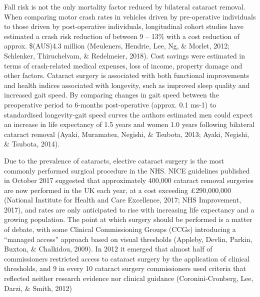 \documentclass[
  english,
  man,floatsintext]{apa6}
\begin{document}
Fall risk is not the only mortality factor reduced by bilateral cataract removal.
When comparing motor crash rates in vehicles driven by pre-operative individuals to those driven by post-operative individuals, longitudinal cohort studies have estimated a crash risk reduction of between 9 -- 13\% with a cost reduction of approx.
\$(AUS)4.3 million (Meuleners, Hendrie, Lee, Ng, \& Morlet, 2012; Schlenker, Thiruchelvam, \& Redelmeier, 2018).
Cost savings were estimated in terms of crash-related medical expenses, loss of income, property damage and other factors.
Cataract surgery is associated with both functional improvements and health indices associated with longevity, such as improved sleep quality and increased gait speed.
By comparing changes in gait speed between the preoperative period to 6-months post-operative (approx. 0.1 ms-1) to standardised longevity-gait speed curves the authors estimated men could expect an increase in life expectancy of 1.5 years and women 1.0 years following bilateral cataract removal (Ayaki, Muramatsu, Negishi, \& Tsubota, 2013; Ayaki, Negishi, \& Tsubota, 2014).

Due to the prevalence of cataracts, elective cataract surgery is the most commonly performed surgical procedure in the NHS.
NICE guidelines published in October 2017 suggested that approximately 400,000 cataract removal surgeries are now performed in the UK each year, at a cost exceeding £290,000,000 (National Institute for Health and Care Excellence, 2017; NHS Improvement, 2017), and rates are only anticipated to rise with increasing life expectancy and a growing population.
The point at which surgery should be performed is a matter of debate, with some Clinical Commissioning Groups (CCGs) introducing a \enquote{managed access} approach based on visual thresholds (Appleby, Devlin, Parkin, Buxton, \& Chalkidou, 2009).
In 2012 it emerged that almost half of commissioners restricted access to cataract surgery by the application of clinical thresholds, and 9 in every 10 cataract surgery commissioners used criteria that reflected neither research evidence nor clinical guidance (Coronini-Cronberg, Lee, Darzi, \& Smith, 2012)
\end{document}
